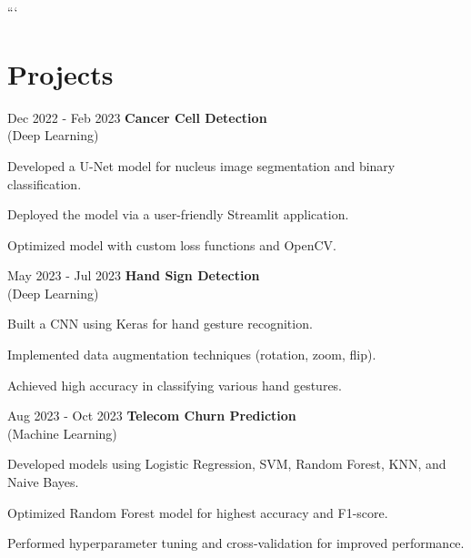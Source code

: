 ```

\section{Projects}
\begin{twocolentry}{Dec 2022 - Feb 2023}
\textbf{Cancer Cell Detection} \\ (Deep Learning)\end{twocolentry}
\vspace{0.10 cm}
\begin{onecolentry}
\begin{highlights}
\item Developed a U-Net model for nucleus image segmentation and binary classification.
\item Deployed the model via a user-friendly Streamlit application.
\item Optimized model with custom loss functions and OpenCV.
\end{highlights}
\end{onecolentry}
\vspace{0.2 cm}
\begin{twocolentry}{May 2023 - Jul 2023}
\textbf{Hand Sign Detection} \\ (Deep Learning)\end{twocolentry}
\vspace{0.10 cm}
\begin{onecolentry}
\begin{highlights}
\item Built a CNN using Keras for hand gesture recognition.
\item Implemented data augmentation techniques (rotation, zoom, flip).
\item Achieved high accuracy in classifying various hand gestures.
\end{highlights}
\end{onecolentry}
\vspace{0.2 cm}
\begin{twocolentry}{Aug 2023 - Oct 2023}
\textbf{Telecom Churn Prediction} \\ (Machine Learning)\end{twocolentry}
\vspace{0.10 cm}
\begin{onecolentry}
\begin{highlights}
\item Developed models using Logistic Regression, SVM, Random Forest, KNN, and Naive Bayes.
\item Optimized Random Forest model for highest accuracy and F1-score.
\item Performed hyperparameter tuning and cross-validation for improved performance.
\end{highlights}
\end{onecolentry}
